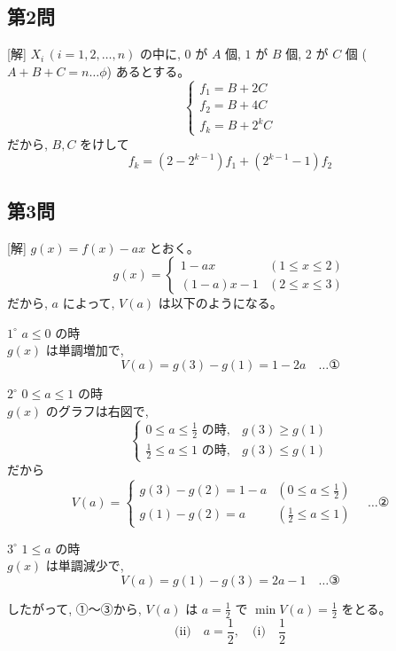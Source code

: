\documentclass[../main.tex]{subfiles}
\begin{document}
\subsection*{第2問}

[解] $X_i \, (i=1, 2, \dots, n)$ の中に, $0$ が $A$ 個, $1$ が $B$ 個, $2$ が $C$ 個 ($A+B+C=n \dots \phi$) あるとする。
\[
  \begin{cases} f_1 = B + 2C \\ f_2 = B + 4C \\ f_k = B + 2^k C
  \end{cases}
\]
だから, $B, C$ をけして
\[
  f_k = (2 - 2^{k-1}) f_1 + (2^{k-1} - 1) f_2
\]

\subsection*{第3問}

[解] $g(x) = f(x) - ax$ とおく。
\[
  g(x) =
  \begin{cases} 1 - ax & (1 \le x \le 2) \\ (1-a)x - 1 & (2 \le x \le 3)
  \end{cases}
\]
だから, $a$ によって, $V(a)$ は以下のようになる。

$1^\circ$ $a \le 0$ の時\\
$g(x)$ は単調増加で,
\[
  V(a) = g(3) - g(1) = 1 - 2a \quad \dots \text{①}
\]

$2^\circ$ $0 \le a \le 1$ の時\\
$g(x)$ のグラフは右図で,
\[
  \begin{cases} 0 \le a \le \frac{1}{2} \text{ の時}, & g(3) \ge g(1) \\ \frac{1}{2} \le a \le 1 \text{ の時}, & g(3) \le g(1)
  \end{cases}
\]
だから
\[
  V(a) =
  \begin{cases} g(3) - g(2) = 1 - a & (0 \le a \le \frac{1}{2}) \\ g(1) - g(2) = a & (\frac{1}{2} \le a \le 1)
  \end{cases} \quad \dots \text{②}
\]

$3^\circ$ $1 \le a$ の時\\
$g(x)$ は単調減少で,
\[
  V(a) = g(1) - g(3) = 2a - 1 \quad \dots \text{③}
\]

したがって, ①〜③から, $V(a)$ は $a = \frac{1}{2}$ で $\min V(a) = \frac{1}{2}$ をとる。
\[
  \text{(ii)} \quad a = \frac{1}{2}, \quad \text{(i)} \quad \frac{1}{2}
\]
\end{document}
